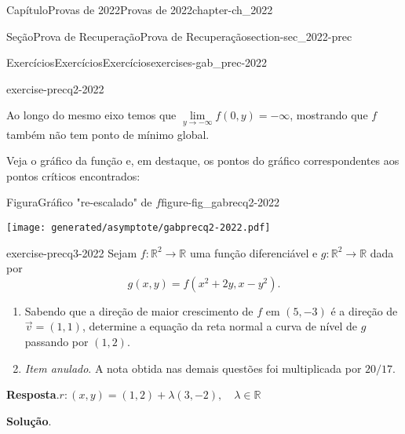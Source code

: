 \documentclass[oneside,10pt,]{book}
\newcommand{\blocktitlefont}{\relax}
\newcommand{\xreffont}{\relax}
\numberwithin{equation}{section}
\newcommand{\R}{\mathbb R}
\begin{document}
\begin{chapterptx}{Capítulo}{Provas de 2022}{}{Provas de 2022}{}{}{chapter-ch_2022}
\begin{sectionptx}{Seção}{Prova de Recuperação}{}{Prova de Recuperação}{}{}{section-sec_2022-prec}
\begin{exercises-subsection-numberless}{Exercícios}{Exercícios}{}{Exercícios}{}{}{exercises-gab_prec-2022}
\begin{divisionexercise}{2}{}{}{exercise-precq2-2022}
\par
Ao longo do mesmo eixo temos que \(\lim\limits_{y\to-\infty}f(0,y)=-\infty\), mostrando que \(f\) também não tem ponto de mínimo global.%
\par
Veja o gráfico da função e, em destaque, os pontos do gráfico correspondentes aos pontos críticos encontrados:%
\begin{figureptx}{Figura}{Gráfico "re-escalado" de \(f\)}{figure-fig_gabrecq2-2022}{}%
\begin{image}{0.25}{0.5}{0.25}{}%
\texttt{[image: generated/asymptote/gabprecq2-2022.pdf]}
\end{image}%
\tcblower
\end{figureptx}%
\end{divisionexercise}%
\begin{divisionexercise}{3}{}{}{exercise-precq3-2022}%
Sejam \(f\colon\R^2\to\R\) uma função diferenciável e \(g\colon\R^2\to\R\) dada por%
\begin{equation*}
g(x, y) = f (x^2 + 2y, x -
y^2).
\end{equation*}
%
\begin{enumerate}[label=\alph*.]
\item{}Sabendo que a direção de maior crescimento de \(f\) em \((5, -3)\) é a direção de \(\vec{v} = (1, 1)\), determine a equação da reta normal a curva de nível de \(g\) passando por \((1, 2)\).%
\item{}\emph{Item anulado}. A nota obtida nas demais questões foi multiplicada por \(20/17\).%
\end{enumerate}
%
\par\smallskip%
\noindent\textbf{\blocktitlefont Resposta}.\hypertarget{answer-precq3-2022-b}{}\quad{}\(r\colon (x,y)=(1,2)+\lambda (3,-2),\quad\lambda\in\R\)%
\par\smallskip%
\noindent\textbf{\blocktitlefont Solução}.\hypertarget{solution-precq3-2022-c}{}\quad{}%
\end{divisionexercise}
\end{exercises-subsection-numberless}
\end{sectionptx}
\end{chapterptx}
\end{document}
